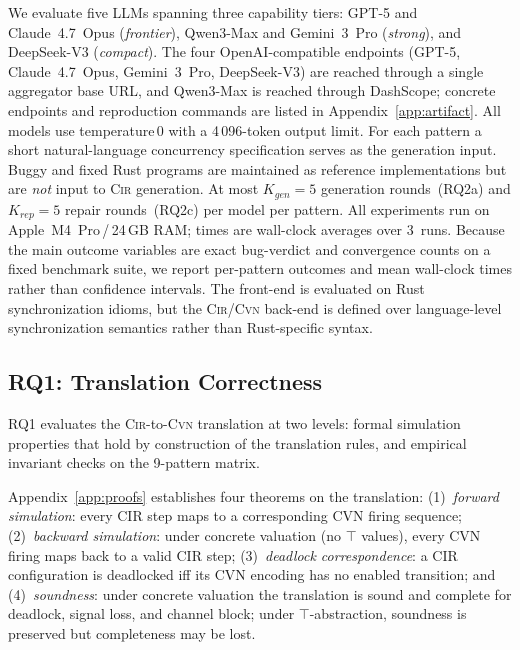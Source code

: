 We evaluate five LLMs spanning three capability tiers: GPT-5 and Claude~4.7~Opus (\emph{frontier}), Qwen3-Max and Gemini~3~Pro (\emph{strong}), and DeepSeek-V3 (\emph{compact}). The four OpenAI-compatible endpoints (GPT-5, Claude~4.7~Opus, Gemini~3~Pro, DeepSeek-V3) are reached through a single aggregator base URL, and Qwen3-Max is reached through DashScope; concrete endpoints and reproduction commands are listed in Appendix~\ref{app:artifact}. All models use temperature\,0 with a 4\,096-token output limit. For each pattern a short natural-language concurrency specification serves as the generation input. Buggy and fixed Rust programs are maintained as reference implementations but are \emph{not} input to \textsc{Cir} generation. At most $K_{\mathit{gen}}=5$ generation rounds~(RQ2a) and $K_{\mathit{rep}}=5$ repair rounds~(RQ2c) per model per pattern. All experiments run on Apple~M4~Pro\,/\,24\,GB RAM; times are wall-clock averages over 3~runs. Because the main outcome variables are exact bug-verdict and convergence counts on a fixed benchmark suite, we report per-pattern outcomes and mean wall-clock times rather than confidence intervals. The front-end is evaluated on Rust synchronization idioms, but the \textsc{Cir}/\textsc{Cvn} back-end is defined over language-level synchronization semantics rather than Rust-specific syntax.

\subsection{RQ1: Translation Correctness}
\label{subsec:rq1}
RQ1 evaluates the \textsc{Cir}-to-\textsc{Cvn} translation at two levels: formal simulation properties that hold by construction of the translation rules, and empirical invariant checks on the 9-pattern matrix.

Appendix~\ref{app:proofs} establishes four theorems on the translation:
(1)~\emph{forward simulation}: every CIR step maps to a  corresponding CVN firing sequence;
(2)~\emph{backward simulation}: under concrete valuation (no $\top$ values), every CVN firing maps back to a
    valid CIR step;
(3)~\emph{deadlock correspondence}: a CIR configuration is deadlocked iff its CVN encoding has no enabled
    transition; and
(4)~\emph{soundness}: under concrete valuation the translation is sound and complete for deadlock, signal
    loss, and channel block; under $\top$-abstraction, soundness is preserved but completeness may be lost.

